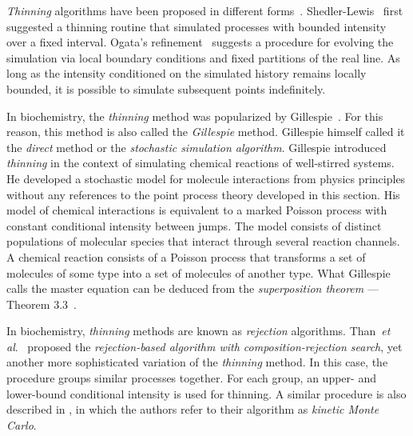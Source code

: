 \documentclass{juliacon}
\numberwithin{equation}{section}
\newcommand{\etal}{\textit{et al}.}
\begin{document}
\textit{Thinning} algorithms have been proposed in different forms~\cite{daley2003}. Shedler-Lewis~\cite{lewis1979} first suggested a thinning routine that simulated processes with bounded intensity over a fixed interval. Ogata's refinement~\cite{ogata1981} suggests a procedure for evolving the simulation via local boundary conditions and fixed partitions of the real line. As long as the intensity conditioned on the simulated history remains locally bounded, it is possible to simulate subsequent points indefinitely.

In biochemistry, the \textit{thinning} method was popularized by Gillespie~\cite{gillespie1976,gillespie1977}. For this reason, this method is also called the \textit{Gillespie} method. Gillespie himself called it the \textit{direct} method or the \textit{stochastic simulation algorithm}. Gillespie introduced \textit{thinning} in the context of simulating chemical reactions of well-stirred systems. He developed a stochastic model for molecule interactions from physics principles without any references to the point process theory developed in this section. His model of chemical interactions is equivalent to a marked Poisson process with constant conditional intensity between jumps. The model consists of distinct populations of molecular species that interact through several reaction channels. A chemical reaction consists of a Poisson process that transforms a set of molecules of some type into a set of molecules of another type. What Gillespie calls the master equation can be deduced from the \textit{superposition theorem} --- Theorem 3.3~\cite{last2017}.

In biochemistry, \textit{thinning} methods are known as \textit{rejection} algorithms. Than~\etal~\cite{thanh2014,thanh2017} proposed the \textit{rejection-based algorithm with composition-rejection search}, yet another more sophisticated variation of the \textit{thinning} method. In this case, the procedure groups similar processes together. For each group, an upper- and lower-bound conditional intensity is used for thinning. A similar procedure is also described in \cite{slepoy2008}, in which the authors refer to their algorithm as \textit{kinetic Monte Carlo}.
\end{document}
